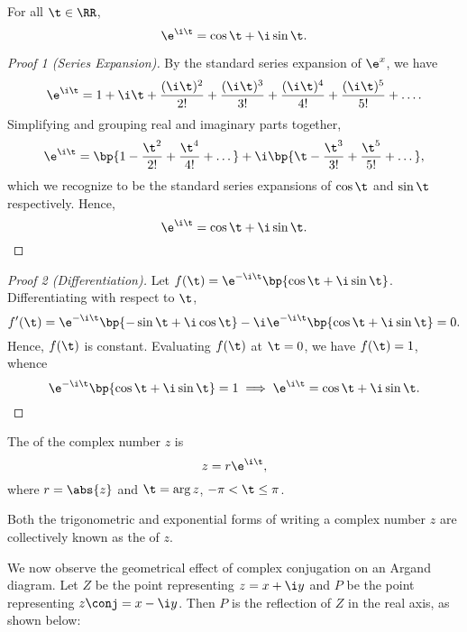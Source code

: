 \begin{theorem}
    For all $\t \in \RR$, \[\e^{\i \t} = \cos \t + \i \sin \t.\]
\end{theorem}
\begin{proof}[Proof 1 (Series Expansion)]
    By the standard series expansion of $\e^x$, we have \[\e^{\i \t} = 1 + \i \t + \frac{(\i \t)^2}{2!} + \frac{(\i \t)^3}{3!} + \frac{(\i \t)^4}{4!} + \frac{(\i \t)^5}{5!} + \dots.\] Simplifying and grouping real and imaginary parts together, \[\e^{\i \t} = \bp{1 - \frac{\t^2}{2!} + \frac{\t^4}{4!} + \dots} + \i \bp{\t - \frac{\t^3}{3!} + \frac{\t^5}{5!} + \dots},\] which we recognize to be the standard series expansions of $\cos \t$ and $\sin \t$ respectively. Hence, \[\e^{\i \t} = \cos \t + \i \sin \t.\]
\end{proof}
\begin{proof}[Proof 2 (Differentiation)]
    Let $f(\t) = \e^{-\i \t} \bp{\cos \t + \i \sin \t}$. Differentiating with respect to $\t$, \[f'(\t) = \e^{-\i \t} \bp{-\sin \t + \i \cos \t} - \i \e^{-\i \t} \bp{\cos \t + \i \sin \t} = 0.\] Hence, $f(\t)$ is constant. Evaluating $f(\t)$ at $\t = 0$, we have $f(\t) = 1$, whence \[\e^{-\i \t} \bp{\cos \t + \i \sin \t} = 1 \implies \e^{\i \t} = \cos \t + \i \sin \t.\]
\end{proof}

\begin{definition}
    The  of the complex number $z$ is \[z = r \e^{\i \t},\] where $r = \abs{z}$ and $\t = \arg{z}$, $-\pi < \t \leq \pi$.
\end{definition}

Both the trigonometric and exponential forms of writing a complex number $z$ are collectively known as the  of $z$.

We now observe the geometrical effect of complex conjugation on an Argand diagram. Let $Z$ be the point representing $z = x + \i y$ and $P$ be the point representing $z\conj = x - \i y$. Then $P$ is the reflection of $Z$ in the real axis, as shown below:

